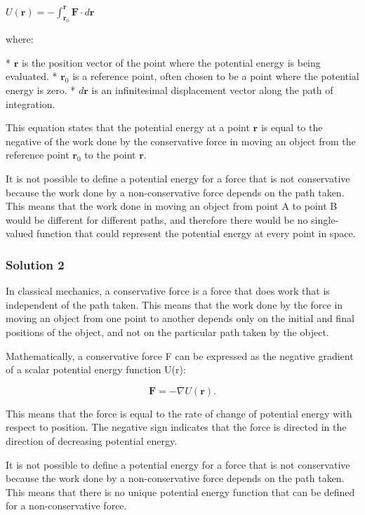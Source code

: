 \documentclass{article}
\begin{document}
$U(\mathbf{r}) = -\int_{\mathbf{r}_0}^{\mathbf{r}} \mathbf{F} \cdot d\mathbf{r}$

where:

* $\mathbf{r}$ is the position vector of the point where the potential energy is being evaluated.
* $\mathbf{r}_0$ is a reference point, often chosen to be a point where the potential energy is zero.
* $d\mathbf{r}$ is an infinitesimal displacement vector along the path of integration.

This equation states that the potential energy at a point $\mathbf{r}$ is equal to the negative of the work done by the conservative force in moving an object from the reference point $\mathbf{r}_0$ to the point $\mathbf{r}$.

It is not possible to define a potential energy for a force that is not conservative because the work done by a non-conservative force depends on the path taken. This means that the work done in moving an object from point A to point B would be different for different paths, and therefore there would be no single-valued function that could represent the potential energy at every point in space.


\subsubsection{Solution 2}

In classical mechanics, a conservative force is a force that does work that is independent of the path taken. This means that the work done by the force in moving an object from one point to another depends only on the initial and final positions of the object, and not on the particular path taken by the object.   

Mathematically, a conservative force F can be expressed as the negative gradient of a scalar potential energy function U(r):

\begin{equation*}
\mathbf{F} = -\nabla U(\mathbf{r}).
\end{equation*}

This means that the force is equal to the rate of change of potential energy with respect to position. The negative sign indicates that the force is directed in the direction of decreasing potential energy.

It is not possible to define a potential energy for a force that is not conservative because the work done by a non-conservative force depends on the path taken. This means that there is no unique potential energy function that can be defined for a non-conservative force.
\end{document}
